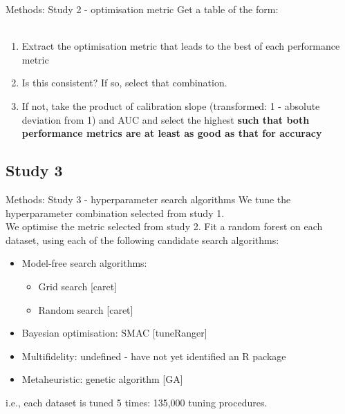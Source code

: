 \documentclass[aspectratio=169]{beamer} %
\begin{document}
\begin{frame}{Methods: Study 2 - optimisation metric}
    Get a table of the form:\\
    \\
    \begin{enumerate}
        \item Extract the optimisation metric that leads to the best of each performance metric
        \item Is this consistent? If so, select that combination.
        \item If not, take the product of calibration slope (transformed: 1 - absolute deviation from 1) and AUC and select the highest \textbf{such that both performance metrics are at least as good as that for accuracy}
    \end{enumerate}
\end{frame}

\subsection{Study 3}

\begin{frame}{Methods: Study 3 - hyperparameter search algorithms}
    We tune the hyperparameter combination selected from study 1.\\
    We optimise the metric selected from study 2.
    Fit a random forest on each dataset, using each of the following candidate search algorithms:\begin{itemize}
        \item Model-free search algorithms:\begin{itemize}
            \item Grid search [caret]
            \item Random search [caret]
        \end{itemize}
        \item Bayesian optimisation: SMAC [tuneRanger]
        \item Multifidelity: undefined - have not yet identified an R package
        \item Metaheuristic: genetic algorithm [GA]
    \end{itemize}
    i.e., each dataset is tuned 5 times: 135,000 tuning procedures.
\end{frame}
\end{document}
